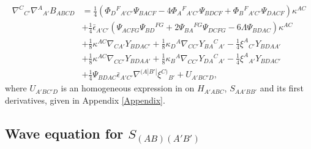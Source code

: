 \documentclass[10pt,a4paper]{article}
\theoremstyle{plain}
\begin{document}
\begin{align}\label{SecondDerivativesOfBuchdahlToEquate2}
 \nabla^{C}{}_{C'}\nabla^{A}{}_{A'}B_{ABCD} &= \tfrac{1}{4}
 \left(\Phi_{D}{}^{F}{}_{A'C'} \Psi_{BACF} - 4 \Phi_{A}{}^{F}{}_{A'C'}
 \Psi_{BDCF} + \Phi_{B}{}^{F}{}_{A'C'} \Psi_{DACF}\right)\kappa^{AC}
 \nonumber \\ & +\tfrac{1}{4}\bar{\epsilon}_{A'C'}\left( \Psi_{ACFG}
 \Psi_{BD}{}^{FG} + 2 \Psi_{BA}{}^{FG} \Psi_{DCFG} - 6\Lambda
 \Psi_{BDAC}\right)\kappa^{AC} \nonumber \\ & + \tfrac{1}{8}
 \kappa^{AC} \nabla_{CA'}Y_{BDAC'} + \tfrac{1}{8} \kappa_{D}{}^{A}
 \nabla_{CC'}Y_{BA}{}^{C}{}_{A'} - \tfrac{1}{4} \xi^{A}{}_{C'}
 Y_{BDAA'} \nonumber \\ & + \tfrac{1}{8} \kappa^{AC}
 \nabla_{CC'}Y_{BDAA'}+ \tfrac{1}{8} \kappa_{B}{}^{A}
 \nabla_{CC'}Y_{DA}{}^{C}{}_{A'} - \tfrac{1}{4} \xi^{A}{}_{A'}
 Y_{BDAC'}\nonumber\\ & + \tfrac{1}{4} \Psi_{BDAC}
 \bar{\epsilon}_{A'C'} \nabla^{(A|B'|}\xi^{C)}{}_{B'} + U_{A'BC'D},
\end{align}
where $ U_{A'BC'D}$ is an homogeneous expression in on $H_{A'ABC}$,
$S_{AA'BB'}$ and its first derivatives, given  in Appendix \ref{Appendix}.

\subsection{Wave equation for $S_{(AB)(A'B')}$}
\label{SecondWaveEquationS}
\end{document}
